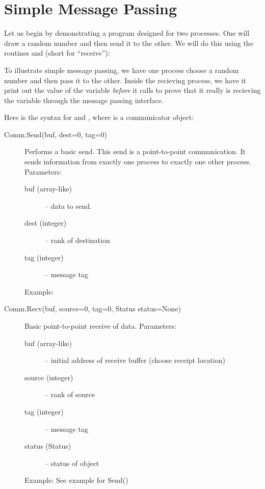 \section*{Simple Message Passing}
Let us begin by demonstrating a program designed for two processes. One will draw a random number and then send it to the other. We will do this using the routines  and  (short for ``receive''):



To illustrate simple message passing, we have one process choose a random number and then pass it to the other. Inside the recieving process, we have it print out the value of the variable  \emph{before} it calls  to prove that it really is recieving the variable through the message passing interface.

Here is the syntax for  and , where  is a communicator object:

\begin{description}
\item[Comm.Send(buf, dest=0, tag=0)]
Performs a basic send. This send is a point-to-point communication. It sends information from exactly one process to exactly one other process.
Parameters:
\begin{description}
\item[buf (array-like)] – data to send.
    

\item[dest (integer)] – rank of destination
\item[tag (integer)] – message tag
\end{description}
Example:

\item[Comm.Recv(buf, source=0, tag=0, Status status=None)]
Basic point-to-point receive of data.
Parameters:
\begin{description}
\item[buf (array-like)] – initial address of receive buffer (choose receipt location)
\item[source (integer)] – rank of source
\item[tag (integer)] – message tag
\item[status (Status)] – status of object
\end{description}
Example:
See example for Send()
\end{description}


